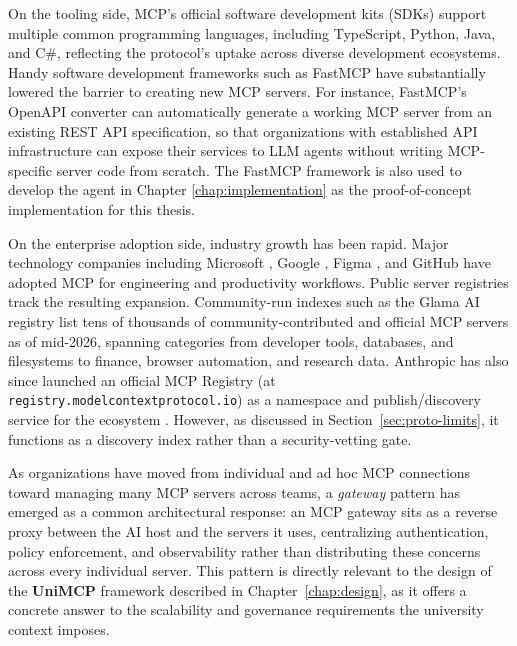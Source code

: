 \documentclass[english, 12pt, a4paper, elec, utf8, a-2b, online]{aaltothesis}
\newcommand{\UniMCP}{\textbf{UniMCP}\xspace}
\newcommand{\aitutor}{\text{AI Tutor}\xspace}
\begin{document}
On the tooling side, MCP's official software development kits (SDKs) support multiple common programming languages, including TypeScript, Python, Java, and C\#, reflecting the protocol's uptake across diverse development ecosystems.
Handy software development frameworks such as FastMCP \cite{fastmcp2026} have substantially lowered the barrier to creating new MCP servers.
For instance, FastMCP's OpenAPI converter \cite{fastmcp_openapi2026} can automatically generate a working MCP server from an existing REST API specification, so that organizations with established API infrastructure can expose their services to LLM agents without writing MCP-specific server code from scratch.
The FastMCP framework is also used to develop the \aitutor agent in Chapter \ref{chap:implementation} as the proof-of-concept implementation for this thesis. 

On the enterprise adoption side, industry growth has been rapid.
Major technology companies including Microsoft \cite{microsoft_mcp_governance2026}, Google \cite{google_mcp2026}, Figma \cite{figma-mcp}, and GitHub \cite{github-mcp-server} have adopted MCP for engineering and productivity workflows.
Public server registries track the resulting expansion.
Community-run indexes such as the Glama AI registry \cite{glama_mcp_servers_2026} list tens of thousands of community-contributed and official MCP servers as of mid-2026, spanning categories from developer tools, databases, and filesystems to finance, browser automation, and research data. Anthropic has also since launched an official MCP Registry (at \texttt{registry.modelcontextprotocol.io}) as a namespace and publish/discovery service for the ecosystem \cite{mcpregistry2026}. However, as discussed in Section~\ref{sec:proto-limits}, it functions as a discovery index rather than a security-vetting gate.

As organizations have moved from individual and ad hoc MCP connections toward managing many MCP servers across teams, a \emph{gateway} pattern has emerged as a common architectural response: an MCP gateway sits as a reverse proxy between the AI host and the servers it uses, centralizing authentication, policy enforcement, and observability rather than distributing these concerns across every individual server. This pattern is directly relevant to the design of the \UniMCP framework described in Chapter~\ref{chap:design}, as it offers a concrete answer to the scalability and governance requirements the university context imposes.

\clearpage
\end{document}
